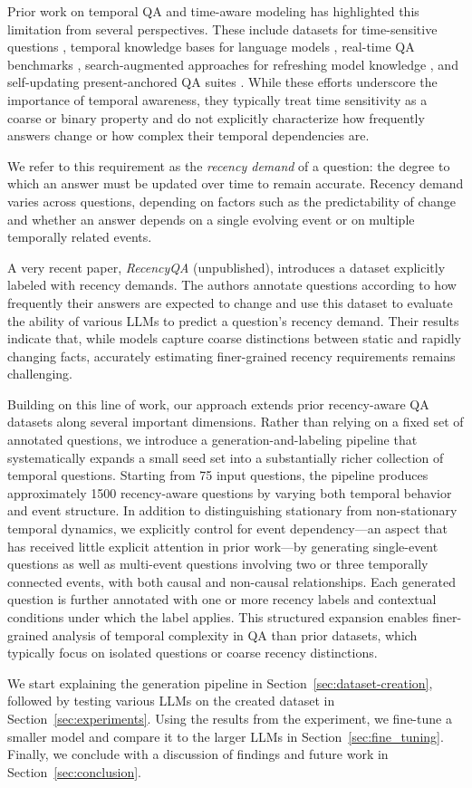 Prior work on temporal QA and time-aware modeling has highlighted this limitation from several perspectives. These include datasets for time-sensitive questions \citep{chen2021datasetansweringtimesensitivequestions}, temporal knowledge bases for language models \citep{10.1162/tacl_a_00459}, real-time QA benchmarks \citep{kasai2024realtimeqawhatsanswer}, search-augmented approaches for refreshing model knowledge \citep{vu-etal-2024-freshllms}, and self-updating present-anchored QA suites \citep{meem-etal-2024-pat}. While these efforts underscore the importance of temporal awareness, they typically treat time sensitivity as a coarse or binary property and do not explicitly characterize how frequently answers change or how complex their temporal dependencies are.

We refer to this requirement as the \textit{recency demand} of a question: the degree to which an answer must be updated over time to remain accurate. Recency demand varies across questions, depending on factors such as the predictability of change and whether an answer depends on a single evolving event or on multiple temporally related events.

A very recent paper, \emph{RecencyQA} (unpublished), introduces a dataset explicitly labeled with recency demands. The authors annotate questions according to how frequently their answers are expected to change and use this dataset to evaluate the ability of various LLMs to predict a question's recency demand. Their results indicate that, while models capture coarse distinctions between static and rapidly changing facts, accurately estimating finer-grained recency requirements remains challenging.

Building on this line of work, our approach extends prior recency-aware QA datasets along several important dimensions. Rather than relying on a fixed set of annotated questions, we introduce a generation-and-labeling pipeline that systematically expands a small seed set into a substantially richer collection of temporal questions. Starting from \num{75} input questions, the pipeline produces approximately \num{1500} recency-aware questions by varying both temporal behavior and event structure. In addition to distinguishing stationary from non-stationary temporal dynamics, we explicitly control for event dependency—an aspect that has received little explicit attention in prior work—by generating single-event questions as well as multi-event questions involving two or three temporally connected events, with both causal and non-causal relationships. Each generated question is further annotated with one or more recency labels and contextual conditions under which the label applies. This structured expansion enables finer-grained analysis of temporal complexity in QA than prior datasets, which typically focus on isolated questions or coarse recency distinctions.

We start explaining the generation pipeline in Section~\ref{sec:dataset-creation}, followed by testing various LLMs on the created dataset in Section~\ref{sec:experiments}. Using the results from the experiment, we fine-tune a smaller model and compare it to the larger LLMs in Section~\ref{sec:fine_tuning}. Finally, we conclude with a discussion of findings and future work in Section~\ref{sec:conclusion}.
